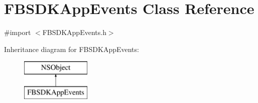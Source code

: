 \hypertarget{interface_f_b_s_d_k_app_events}{}\section{F\+B\+S\+D\+K\+App\+Events Class Reference}
\label{interface_f_b_s_d_k_app_events}


{\ttfamily \#import $<$F\+B\+S\+D\+K\+App\+Events.\+h$>$}

Inheritance diagram for F\+B\+S\+D\+K\+App\+Events\+:\begin{figure}[H]
\begin{center}
\leavevmode
\includegraphics[height=2.000000cm]{interface_f_b_s_d_k_app_events}
\end{center}
\end{figure}
